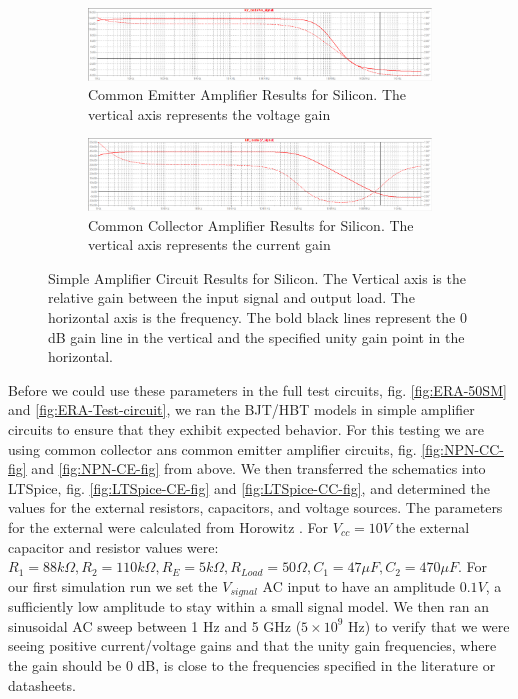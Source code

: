 \documentclass[conference]{IEEEtran}
\begin{document}
\begin{figure}[htbp]
    \centering
    \begin{subfigure}[b]{\textwidth}
        \centerline{\includegraphics[width=\textwidth]{figures/Si-Result-CE.png}}
        \caption{Common Emitter Amplifier Results for Silicon. The vertical axis represents the voltage gain}
        \label{fig:Si-Result-CE}
    \end{subfigure}
    \par\bigskip
    \begin{subfigure}[b]{\textwidth}
        \centerline{\includegraphics[width=\textwidth]{figures/Si-Result-CC.png}}
        \caption{Common Collector Amplifier Results for Silicon. The vertical axis represents the current gain}
        \label{fig:Si-Result-CC}
    \end{subfigure}
    \caption{Simple Amplifier Circuit Results for Silicon. The Vertical axis is the relative gain between the input signal and output load.
        The horizontal axis is the frequency. The bold black lines represent the 0 dB gain line in the vertical and the specified unity gain
        point in the horizontal.}
\end{figure}

Before we could use these parameters in the full test circuits, fig. \ref{fig:ERA-50SM} and \ref{fig:ERA-Test-circuit}, we ran the
BJT/HBT models in simple amplifier circuits to ensure that they exhibit expected behavior. For this testing we are using common collector
ans common emitter amplifier circuits, fig. \ref{fig:NPN-CC-fig} and \ref{fig:NPN-CE-fig} from above. We then transferred the schematics
into LTSpice, fig. \ref{fig:LTSpice-CE-fig} and \ref{fig:LTSpice-CC-fig}, and determined the values for the external resistors, capacitors,
and voltage sources. The parameters for the external were calculated from Horowitz \cite{horowitz_art_2015}. For $V_{cc} = 10 V$ the external capacitor
and resistor values were: $R_1 = 88 k\Omega, R_2 = 110 k\Omega, R_E = 5 k\Omega, R_{Load} = 50 \Omega, C_1 = 47 \mu F, C_2 = 470 \mu F$.
For our first simulation run we set the $V_{signal}$ AC input to have an amplitude $0.1V$, a sufficiently low amplitude to stay within a small signal
model. We then ran an sinusoidal AC sweep between 1 Hz and 5 GHz ($5 \times 10^9$ Hz) to verify that we were seeing positive current/voltage gains
and that the unity gain frequencies, where the gain should be 0 dB, is close to the frequencies specified in the literature or datasheets.
\end{document}
